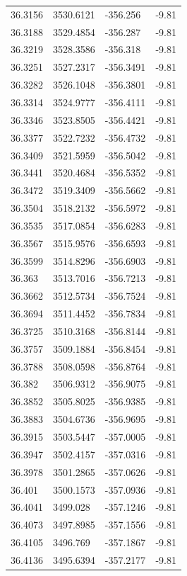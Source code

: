 \begin{table}[H]
\begin{tabular}{llll}
36.3156 & 3530.6121 & -356.256 & -9.81 \\
36.3188 & 3529.4854 & -356.287 & -9.81 \\
36.3219 & 3528.3586 & -356.318 & -9.81 \\
36.3251 & 3527.2317 & -356.3491 & -9.81 \\
36.3282 & 3526.1048 & -356.3801 & -9.81 \\
36.3314 & 3524.9777 & -356.4111 & -9.81 \\
36.3346 & 3523.8505 & -356.4421 & -9.81 \\
36.3377 & 3522.7232 & -356.4732 & -9.81 \\
36.3409 & 3521.5959 & -356.5042 & -9.81 \\
36.3441 & 3520.4684 & -356.5352 & -9.81 \\
36.3472 & 3519.3409 & -356.5662 & -9.81 \\
36.3504 & 3518.2132 & -356.5972 & -9.81 \\
36.3535 & 3517.0854 & -356.6283 & -9.81 \\
36.3567 & 3515.9576 & -356.6593 & -9.81 \\
36.3599 & 3514.8296 & -356.6903 & -9.81 \\
36.363 & 3513.7016 & -356.7213 & -9.81 \\
36.3662 & 3512.5734 & -356.7524 & -9.81 \\
36.3694 & 3511.4452 & -356.7834 & -9.81 \\
36.3725 & 3510.3168 & -356.8144 & -9.81 \\
36.3757 & 3509.1884 & -356.8454 & -9.81 \\
36.3788 & 3508.0598 & -356.8764 & -9.81 \\
36.382 & 3506.9312 & -356.9075 & -9.81 \\
36.3852 & 3505.8025 & -356.9385 & -9.81 \\
36.3883 & 3504.6736 & -356.9695 & -9.81 \\
36.3915 & 3503.5447 & -357.0005 & -9.81 \\
36.3947 & 3502.4157 & -357.0316 & -9.81 \\
36.3978 & 3501.2865 & -357.0626 & -9.81 \\
36.401 & 3500.1573 & -357.0936 & -9.81 \\
36.4041 & 3499.028 & -357.1246 & -9.81 \\
36.4073 & 3497.8985 & -357.1556 & -9.81 \\
36.4105 & 3496.769 & -357.1867 & -9.81 \\
36.4136 & 3495.6394 & -357.2177 & -9.81 \\

\end{tabular}
\end{table}
